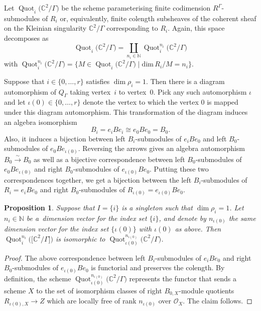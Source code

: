 \documentclass[pdftex]{sigma}%
\newtheorem{Proposition}[Theorem]{Proposition}
 { \theoremstyle{definition}
\newtheorem{Definition}[Theorem]{Definition}
\newtheorem{Example}[Theorem]{Example}
\newtheorem{Remark}[Theorem]{Remark}
\newtheorem{remarks}[theorem]{Remarks}
}
\newcommand{\SC}{\mathbb{C}} %
\newcommand{\PiGamma}{B}
\DeclareMathOperator{\Quot}{\mathrm{Quot}}
\newcommand{\Quoti}[1][ ]{\Quot_i^{#1}}
\newcommand{\Quotini}{\Quoti[n_i]}
\numberwithin{equation}{section}
\begin{document}
Let $\Quoti \big(\SC^2/\Gamma\big)$ be the scheme parameterising finite codimension $R^{\Gamma}$-submodules of $R_i$
or, equivalently, finite colength subsheaves of the coherent sheaf on the Kleinian singularity $\SC^2/\Gamma$ corresponding to $R_i$.
Again, this space decomposes as
\[ \Quoti \big(\SC^2/\Gamma\big)=\coprod_{n_i\in \mathbb{N}} \Quotini \big(\SC^2/\Gamma\big) \]
with $\Quotini \big(\SC^2/\Gamma\big) = \big\{M \in \Quoti \big(\SC^2/\Gamma\big) \mid
\mathrm{dim}\,R_i/M =n_i
\big\}$.

Suppose that $i\in\{0,\ldots, r\}$ satisfies $\dim \rho_i =1$. Then there is a diagram automorphism of $Q_\Gamma$ taking vertex~$i$ to vertex~$0$. Pick any such
automorphism $\iota$ and let
$\iota(0) \in \{0,\dots,r\}$ denote the vertex to which the
vertex $0$ is mapped under this diagram automorphism. This transformation of the diagram induces an algebra isomorphism \[B_i=e_i \PiGamma e_i\cong e_0 \PiGamma e_0=B_0.\]
Also, it induces a bijection between left $B_i$-submodules of $e_iBe_0$ and left $B_0$-submodules of $e_{0}Be_{\iota(0)}$. Reversing the arrows gives an algebra automorphism $B_0 \xrightarrow{\sim} B_0$ as well as a bijective correspondence between left $B_0$-submodules of $e_{0}Be_{\iota(0)}$ and right $B_0$-submodules of $e_{\iota(0)}Be_{0}$. Putting these two correspondences together, we get a bijection between the left $B_i$-submodules of $R_i=e_iBe_0$ and right $B_0$-submodules of $R_{\iota(0)}=e_{\iota(0)}Be_{0}$.

\begin{Proposition}\label{prop:Quotcommiso}
Suppose that $I=\{i\}$ is a singleton such
that $\dim \rho_i =1$. Let $n_i \in \mathbb{N}$
be a~dimension vector for the index set $\{i\}$, and denote
by $n_{\iota(0)}$ the same dimension vector for the
index set $\{\iota(0)\}$ with $\iota(0)$
as above. Then $\Quotini \big(\big[\SC^2/\Gamma\big]\big)$ is isomorphic
to $\Quot_{\iota(0)}^{n_{\iota(0)}}\big(\SC^2/\Gamma\big)$.
\end{Proposition}
\begin{proof}
The above correspondence between left $B_i$-sub\-modules of $e_iBe_0$
and right $B_0$-sub\-mo\-du\-les of $e_{\iota(0)}Be_{0}$ is functorial
and preserves the colength. By definition, the scheme
$\Quot_{\iota(0)}^{n_{\iota(0)}}\!\big(\SC^2/\Gamma\big)$ represents the functor
that sends a scheme $X$ to the set of isomorphism classes of
right $\PiGamma_{0,X}$-module quotients $R_{\iota(0),X} \to Z$ which are
locally free of rank $n_{\iota(0)}$ over $\mathcal{O}_X$. The claim follows.
\end{proof}
\end{document}
